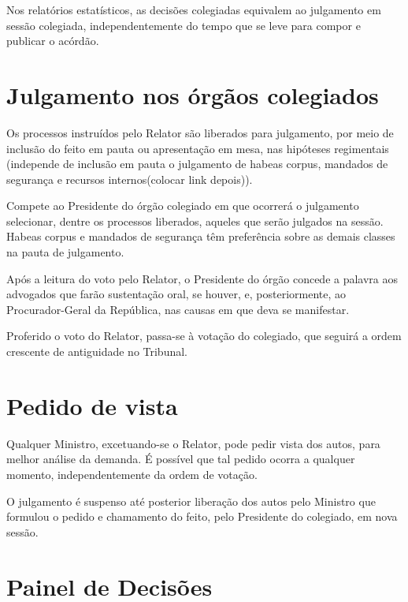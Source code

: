 \documentclass[
]{book}
\begin{document}
Nos relatórios estatísticos, as decisões colegiadas equivalem ao julgamento em sessão colegiada, independentemente do tempo que se leve para compor e publicar o acórdão.

\hypertarget{julgamento-nos-uxf3rguxe3os-colegiados-1}{%
\section{Julgamento nos órgãos colegiados}\label{julgamento-nos-uxf3rguxe3os-colegiados-1}}

Os processos instruídos pelo Relator são liberados para julgamento, por meio de inclusão do feito em pauta ou apresentação em mesa, nas hipóteses regimentais (independe de inclusão em pauta o julgamento de habeas corpus, mandados de segurança e recursos internos(colocar link depois)).

Compete ao Presidente do órgão colegiado em que ocorrerá o julgamento selecionar, dentre os processos liberados, aqueles que serão julgados na sessão. Habeas corpus e mandados de segurança têm preferência sobre as demais classes na pauta de julgamento.

Após a leitura do voto pelo Relator, o Presidente do órgão concede a palavra aos advogados que farão sustentação oral, se houver, e, posteriormente, ao Procurador-Geral da República, nas causas em que deva se manifestar.

Proferido o voto do Relator, passa-se à votação do colegiado, que seguirá a ordem crescente de antiguidade no Tribunal.

\hypertarget{pedido-de-vista-1}{%
\section{Pedido de vista}\label{pedido-de-vista-1}}

Qualquer Ministro, excetuando-se o Relator, pode pedir vista dos autos, para melhor análise da demanda. É possível que tal pedido ocorra a qualquer momento, independentemente da ordem de votação.

O julgamento é suspenso até posterior liberação dos autos pelo Ministro que formulou o pedido e chamamento do feito, pelo Presidente do colegiado, em nova sessão.

\hypertarget{painel-de-decisuxf5es}{%
\section{Painel de Decisões}\label{painel-de-decisuxf5es}}
\end{document}
